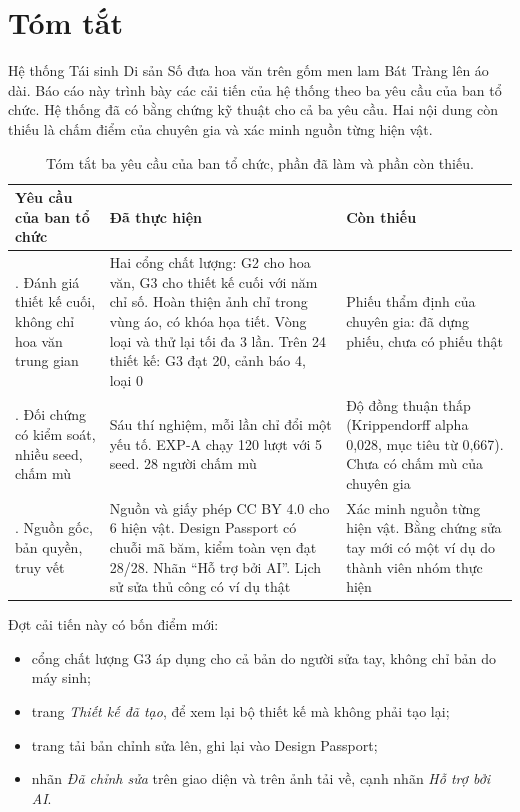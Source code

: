 \chapter*{Tóm tắt}

Hệ thống Tái sinh Di sản Số đưa hoa văn trên gốm men lam Bát Tràng lên áo dài. Báo cáo này trình bày các cải tiến của hệ thống theo ba yêu cầu của ban tổ chức. Hệ thống đã có bằng chứng kỹ thuật cho cả ba yêu cầu. Hai nội dung còn thiếu là chấm điểm của chuyên gia và xác minh nguồn từng hiện vật.

\begin{table}[htbp]
\centering
\small
\begin{tabularx}{\textwidth}{>{\raggedright\arraybackslash}p{3.3cm}>{\raggedright\arraybackslash}X>{\raggedright\arraybackslash}p{4.2cm}}
\toprule
\textbf{Yêu cầu của ban tổ chức} & \textbf{Đã thực hiện} & \textbf{Còn thiếu} \\
\midrule
1. Đánh giá thiết kế cuối, không chỉ hoa văn trung gian &
Hai cổng chất lượng: G2 cho hoa văn, G3 cho thiết kế cuối với năm chỉ số. Hoàn thiện ảnh chỉ trong vùng áo, có khóa họa tiết. Vòng loại và thử lại tối đa 3 lần. Trên 24 thiết kế: G3 đạt 20, cảnh báo 4, loại 0 &
Phiếu thẩm định của chuyên gia: đã dựng phiếu, chưa có phiếu thật \\
\addlinespace
2. Đối chứng có kiểm soát, nhiều seed, chấm mù &
Sáu thí nghiệm, mỗi lần chỉ đổi một yếu tố. EXP-A chạy 120 lượt với 5 seed. 28 người chấm mù &
Độ đồng thuận thấp (Krippendorff alpha 0,028, mục tiêu từ 0,667). Chưa có chấm mù của chuyên gia \\
\addlinespace
3. Nguồn gốc, bản quyền, truy vết &
Nguồn và giấy phép CC BY 4.0 cho 6 hiện vật. Design Passport có chuỗi mã băm, kiểm toàn vẹn đạt 28/28. Nhãn “Hỗ trợ bởi AI”. Lịch sử sửa thủ công có ví dụ thật &
Xác minh nguồn từng hiện vật. Bằng chứng sửa tay mới có một ví dụ do thành viên nhóm thực hiện \\
\bottomrule
\end{tabularx}
\caption{Tóm tắt ba yêu cầu của ban tổ chức, phần đã làm và phần còn thiếu.}
\label{tab:tomtat}
\end{table}

Đợt cải tiến này có bốn điểm mới:
\begin{itemize}
  \item cổng chất lượng G3 áp dụng cho cả bản do người sửa tay, không chỉ bản do máy sinh;
  \item trang \emph{Thiết kế đã tạo}, để xem lại bộ thiết kế mà không phải tạo lại;
  \item trang tải bản chỉnh sửa lên, ghi lại vào Design Passport;
  \item nhãn \emph{Đã chỉnh sửa} trên giao diện và trên ảnh tải về, cạnh nhãn \emph{Hỗ trợ bởi AI}.
\end{itemize}

